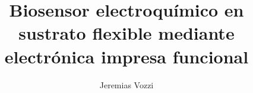 \documentclass[twoside,numbers,spanish]{clases}
\author{Jeremias Vozzi}
\title{Biosensor electroqu\'imico en sustrato flexible mediante electr\'onica impresa funcional}
\begin{document}





\tableofcontents
\listoffigures








\appendix
\renewcommand{\appendixname}{Anexo}


%

 



%
\end{document}
